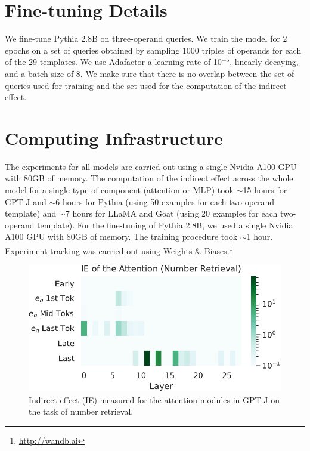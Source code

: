 \documentclass[11pt]{article}
\begin{document}
\section{Fine-tuning Details}
\label{appendix:finetuning}
We fine-tune Pythia 2.8B on three-operand queries. We train the model for 2 epochs on a set of queries obtained by sampling 1000 triples of operands for each of the 29 templates. We use Adafactor \cite{shazeer2018adafactor} a learning rate of 10$^{-5}$, linearly decaying, and a batch size of 8. We make sure that there is no overlap between the set of queries used for training and the set used for the computation of the indirect effect.

\section{Computing Infrastructure}
The experiments for all models are carried out using a single Nvidia A100 GPU with 80GB of memory. The computation of the indirect effect across the whole model for a single type of component (attention or MLP) took $\sim$15 hours for GPT-J and $\sim$6 hours for Pythia (using 50 examples for each two-operand template) and $\sim$7 hours for LLaMA and Goat (using 20 examples for each two-operand template).
For the fine-tuning of Pythia 2.8B, we used a single Nvidia A100 GPU with 80GB of memory. The training procedure took $\sim$1 hour.
Experiment tracking was carried out using Weights \& Biases.\footnote{\url{http://wandb.ai}}


\begin{figure}[t]
    \centering
    \includegraphics[width=0.9\columnwidth]{img/j/j-attn-int11.pdf}
    \caption{Indirect effect (IE) measured for the attention modules in GPT-J on the task of number retrieval.}
    \label{fig:j-int11-attn}
\end{figure}
\end{document}
